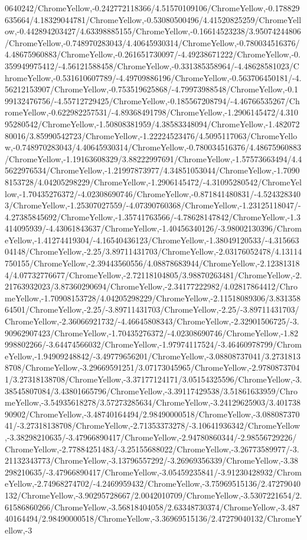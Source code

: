 {\begin{tikzternal}
0640242/ChromeYellow,-0.242772118366/4.51570109106/ChromeYellow,-0.178829635664/4.18329044781/ChromeYellow,-0.53080500496/4.41520825259/ChromeYellow,-0.442894203427/4.63398885155/ChromeYellow,-0.16614523238/3.95074244806/ChromeYellow,-0.748970283043/4.40645930314/ChromeYellow,-0.780034516376/4.48675960883/ChromeYellow,-0.261651730097/-4.49238671222/ChromeYellow,-0.359949975412/-4.56121588458/ChromeYellow,-0.331385358964/-4.48628581023/ChromeYellow,-0.531610607789/-4.49709886196/ChromeYellow,-0.563706450181/-4.56212153907/ChromeYellow,-0.753519625868/-4.79973988548/ChromeYellow,-0.199132476756/-4.55712729425/ChromeYellow,-0.185567208794/-4.46766535267/ChromeYellow,-0.622982257531/-4.89368491798/ChromeYellow,-1.2906145472/4.31095280542/ChromeYellow,-1.50808381959/4.38583348094/ChromeYellow,-1.48207280016/3.85990542723/ChromeYellow,-1.22224523476/4.5095117063/ChromeYellow,-0.748970283043/4.40645930314/ChromeYellow,-0.780034516376/4.48675960883/ChromeYellow,-1.19163608329/3.88222997691/ChromeYellow,-1.57573663494/4.45622976534/ChromeYellow,-1.21997873977/4.34851053044/ChromeYellow,-1.70908153728/4.04205298229/ChromeYellow,-1.2906145472/-4.31095280542/ChromeYellow,-1.70435276372/-4.02308690746/ChromeYellow,-0.871841480831/-4.5243283403/ChromeYellow,-1.25307027559/-4.07390760368/ChromeYellow,-1.23125118047/-4.27385845692/ChromeYellow,-1.35741763566/-4.78628147842/ChromeYellow,-1.3414095939/-4.43061843637/ChromeYellow,-1.40456340126/-3.98002130396/ChromeYellow,-1.41274419304/-4.16540436123/ChromeYellow,-1.38049120533/-4.31566304148/ChromeYellow,-2.25/3.89711431703/ChromeYellow,-2.03176052478/4.13114750155/ChromeYellow,-2.39443560556/4.08878683944/ChromeYellow,-2.123813184/4.07732776677/ChromeYellow,-2.72118104805/3.98870263481/ChromeYellow,-2.21763932023/3.87360290694/ChromeYellow,-2.34177222982/4.02817864412/ChromeYellow,-1.70908153728/4.04205298229/ChromeYellow,-2.11518089306/3.83135864501/ChromeYellow,-2.25/-3.89711431703/ChromeYellow,-2.25/-3.89711431703/ChromeYellow,-2.36066921732/-4.46645808343/ChromeYellow,-2.32901506725/-3.90962907423/ChromeYellow,-1.70435276372/-4.02308690746/ChromeYellow,-1.82998802266/-3.64474566032/ChromeYellow,-1.97974117524/-3.46460978799/ChromeYellow,-1.94909248842/-3.49779656201/ChromeYellow,-3.08808737041/3.27318138708/ChromeYellow,-3.29669591251/3.07173045965/ChromeYellow,-2.97808737041/3.27318138708/ChromeYellow,-3.37177124171/3.05154325596/ChromeYellow,-3.38545807084/3.43801665796/ChromeYellow,-3.39117429538/3.51861633959/ChromeYellow,-3.54935618278/3.57273285634/ChromeYellow,-3.24129625903/3.40173890902/ChromeYellow,-3.48740164494/2.98490000518/ChromeYellow,-3.08808737041/-3.27318138708/ChromeYellow,-2.71353373278/-3.10641936342/ChromeYellow,-3.38298210635/-3.47966890417/ChromeYellow,-2.94780860344/-2.98556729226/ChromeYellow,-2.77884251483/-3.25155688022/ChromeYellow,-3.26773589977/-3.21132343773/ChromeYellow,-3.13796557292/-3.26969356339/ChromeYellow,-3.38298210635/-3.47966890417/ChromeYellow,-3.05459235841/-3.91230428932/ChromeYellow,-2.74968274702/-4.2469959432/ChromeYellow,-3.75969515136/2.47279040132/ChromeYellow,-3.90295728667/2.0042010709/ChromeYellow,-3.5307221654/2.61586860266/ChromeYellow,-3.56818404058/2.63348730374/ChromeYellow,-3.48740164494/2.98490000518/ChromeYellow,-3.36969515136/2.47279040132/ChromeYellow,-3
\end{tikzternal}}
